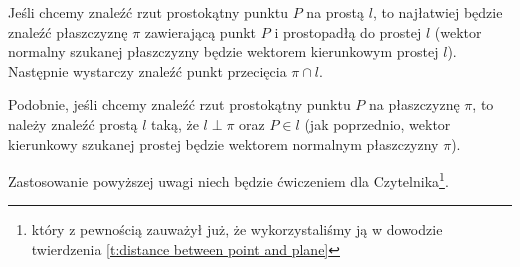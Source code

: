 \begin{remark*}
    Jeśli chcemy znaleźć rzut prostokątny punktu $P$ na prostą $l$, to najłatwiej będzie znaleźć płaszczyznę $\pi$ zawierającą punkt $P$ i prostopadłą do prostej $l$ (wektor normalny szukanej płaszczyzny będzie wektorem kierunkowym prostej $l$). Następnie wystarczy znaleźć punkt przecięcia $\pi \cap l$.

    Podobnie, jeśli chcemy znaleźć rzut prostokątny punktu $P$ na płaszczyznę $\pi$, to należy znaleźć prostą $l$ taką, że $l \perp \pi$ oraz $P \in l$ (jak poprzednio, wektor kierunkowy szukanej prostej będzie wektorem normalnym płaszczyzny $\pi$).
\end{remark*}

Zastosowanie powyższej uwagi niech będzie ćwiczeniem dla Czytelnika\footnote{który z pewnością zauważył już, że wykorzystaliśmy ją w dowodzie twierdzenia \ref{t:distance between point and plane}}.